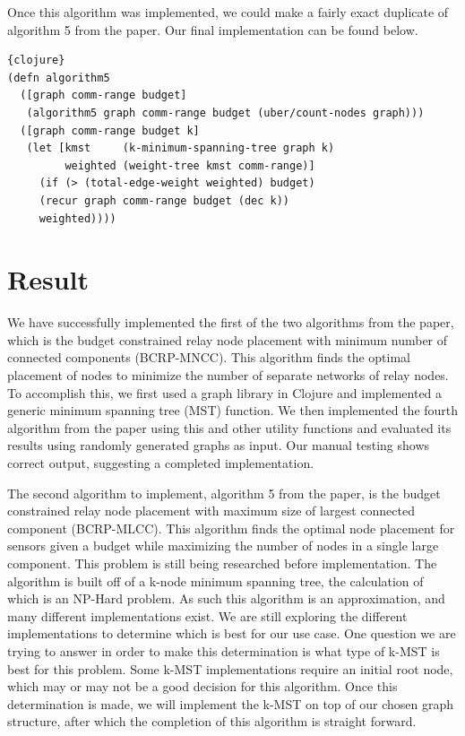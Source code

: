 \documentclass{article}
\begin{document}
Once this algorithm was implemented, we could make a fairly exact duplicate of algorithm 5 from the paper.
Our final implementation can be found below.


\begin{lstlisting}{clojure}
(defn algorithm5
  ([graph comm-range budget]
   (algorithm5 graph comm-range budget (uber/count-nodes graph)))
  ([graph comm-range budget k]
   (let [kmst     (k-minimum-spanning-tree graph k)
         weighted (weight-tree kmst comm-range)]
     (if (> (total-edge-weight weighted) budget)
     (recur graph comm-range budget (dec k))
     weighted))))
\end{lstlisting}

\section{Result}
We have successfully implemented the first of the two algorithms from the paper, which is the budget constrained relay node placement with minimum number of connected components (BCRP-MNCC).
This algorithm finds the optimal placement of nodes to minimize the number of separate networks of relay nodes.
To accomplish this, we first used a graph library in Clojure and implemented a generic minimum spanning tree (MST) function.
We then implemented the fourth algorithm from the paper using this and other utility functions and evaluated its results using randomly generated graphs as input.
Our manual testing shows correct output, suggesting a completed implementation.

The second algorithm to implement, algorithm 5 from the paper, is the budget constrained relay node placement with maximum size of largest connected component (BCRP-MLCC).
This algorithm finds the optimal node placement for sensors given a budget while maximizing the number of nodes in a single large component.
This problem is still being researched before implementation.
The algorithm is built off of a k-node minimum spanning tree, the calculation of which is an NP-Hard problem.
As such this algorithm is an approximation, and many different implementations exist.
We are still exploring the different implementations to determine which is best for our use case.
One question we are trying to answer in order to make this determination is what type of k-MST is best for this problem.
Some k-MST implementations require an initial root node, which may or may not be a good decision for this algorithm.
Once this determination is made, we will implement the k-MST on top of our chosen graph structure, after which the completion of this algorithm is straight forward.
\end{document}
